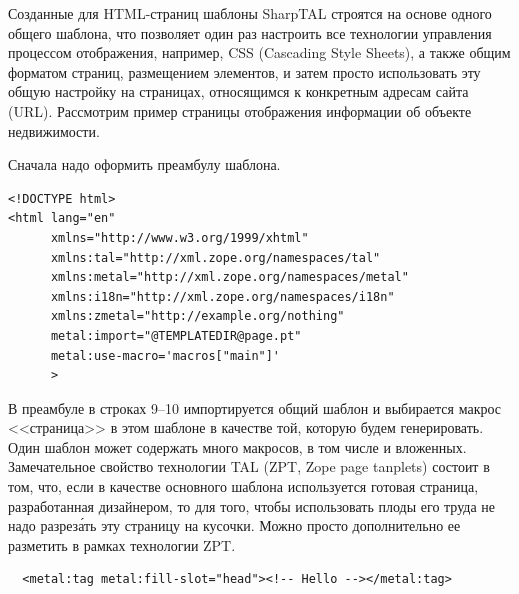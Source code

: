 \documentclass[a4paper,14pt,openany,final]{extreport} %
\begin{document}
{Созданные для HTML-страниц шаблоны SharpTAL строятся на основе одного общего шаблона, что позволяет один раз настроить все технологии управления процессом отображения, например, CSS (\foreignlanguage{english}{Cascading Style Sheets}), а также общим форматом страниц, размещением элементов, и затем просто использовать эту общую настройку на страницах, относящимся к конкретным адресам сайта (URL). Рассмотрим пример страницы отображения информации об объекте недвижимости.

Сначала надо оформить преамбулу шаблона.
\begin{verbatim}
<!DOCTYPE html>
<html lang="en"
      xmlns="http://www.w3.org/1999/xhtml"
      xmlns:tal="http://xml.zope.org/namespaces/tal"
      xmlns:metal="http://xml.zope.org/namespaces/metal"
      xmlns:i18n="http://xml.zope.org/namespaces/i18n"
      xmlns:zmetal="http://example.org/nothing"
      metal:import="@TEMPLATEDIR@page.pt"
      metal:use-macro='macros["main"]'
      >
\end{verbatim}
В преамбуле в строках 9--10 импортируется общий шаблон и выбирается макрос <<страница>> в этом шаблоне в качестве той, которую будем генерировать. Один шаблон может содержать много макросов, в том числе и вложенных. Замечательное свойство технологии TAL (ZPT, \foreignlanguage{english}{Zope page tanplets}) состоит в том, что, если в качестве основного шаблона используется готовая страница, разработанная дизайнером, то для того, чтобы использовать плоды его труда не надо разрез\'ать эту страницу на кусочки. Можно просто дополнительно ее разметить в рамках технологии ZPT.
\begin{verbatim}
  <metal:tag metal:fill-slot="head"><!-- Hello --></metal:tag>


\end{verbatim}}
\end{document}
